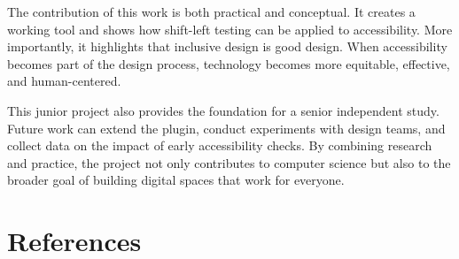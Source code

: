 \documentclass[12pt]{article}
\begin{document}
The contribution of this work is both practical and conceptual. It creates a working tool and shows how
shift-left testing can be applied to accessibility. More importantly, it highlights that inclusive design is
good design. When accessibility becomes part of the design process, technology becomes more equitable,
effective, and human-centered.

This junior project also provides the foundation for a senior independent study. Future work can extend
the plugin, conduct experiments with design teams, and collect data on the impact of early accessibility
checks. By combining research and practice, the project not only contributes to computer science but also
to the broader goal of building digital spaces that work for everyone.

\section*{References}
\end{document}
